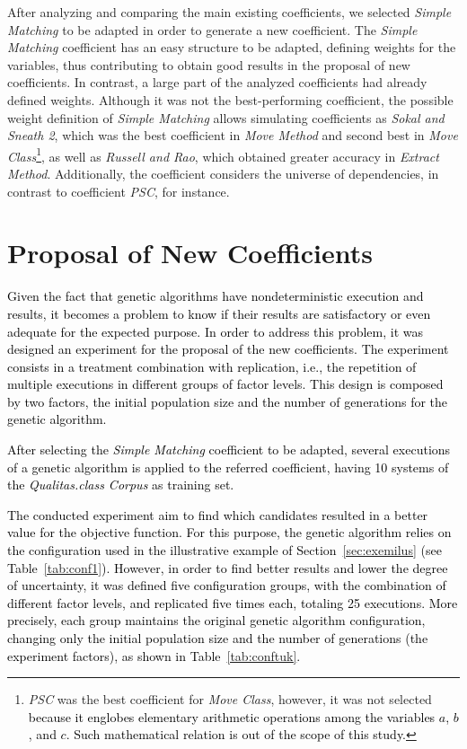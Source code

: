 \documentclass[smallextended,natbib]{svjour3}
\begin{document}
{After analyzing and comparing the main existing coefficients, we selected \textit{Simple Matching} to be adapted in order to generate a new coefficient. The \textit{Simple Matching} coefficient has an easy structure to be adapted, defining weights for the variables, thus contributing to obtain good results in the proposal of new coefficients. In contrast, a large part of the analyzed coefficients had already defined weights. Although it was not the best-performing coefficient, the possible weight definition of \textit{Simple Matching} allows simulating coefficients as \textit{Sokal and Sneath 2}, which was the best coefficient in \textit{Move Method} and second best in \textit{Move Class}\footnote{\textit{PSC} was the best coefficient for \textit{Move Class}, however, it was not selected \textcolor{black}{because it englobes elementary arithmetic operations among the variables $a$, $b$, and $c$. Such mathematical relation is out of the scope of this study.}}, as well as \textit{Russell and Rao}, which obtained greater accuracy in \textit{Extract Method}. Additionally, the coefficient considers the universe of dependencies, in contrast to coefficient \textit{PSC}, for instance.


\section{Proposal of New Coefficients}
\label{sec:proposta}

\textcolor{black}{Given the fact that genetic algorithms have nondeterministic execution and results, it becomes a problem to know if their results are satisfactory or even adequate for the expected purpose. In order to address this problem, it was designed an experiment for the proposal of the new coefficients. The experiment consists in a treatment combination with replication, i.e., the repetition of multiple executions in different groups of factor levels. This design is composed by two factors, the initial population size and the number of generations for the genetic algorithm.}

\textcolor{black}{After selecting the \textit{Simple Matching} coefficient to be adapted, several executions of a genetic algorithm is applied to the referred coefficient, having 10 systems of the \textit{Qualitas.class Corpus} as training set.}

\textcolor{black}{The conducted experiment aim to find which candidates resulted in a better value for the objective function. %
For this purpose, the genetic algorithm relies on the configuration used in the illustrative example of Section~\ref{sec:exemilus} (see Table~\ref{tab:conf1}). However, in order to find better results and lower the degree of uncertainty, it was defined five configuration groups, with the combination of different factor levels, and replicated five times each, totaling 25 executions. More precisely, each group maintains the original genetic algorithm configuration, changing only the initial population size and the number of generations (the experiment factors), as shown in Table~\ref{tab:conftuk}.} 

}
\end{document}
